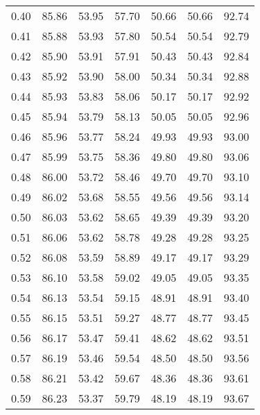 \begin{tabular}{|c|c|c|c|c|c|c|}
      0.40 &     85.86 &     53.95 &      57.70 &   50.66 &      50.66 &         92.74 \\
      0.41 &     85.88 &     53.93 &      57.80 &   50.54 &      50.54 &         92.79 \\
      0.42 &     85.90 &     53.91 &      57.91 &   50.43 &      50.43 &         92.84 \\
      0.43 &     85.92 &     53.90 &      58.00 &   50.34 &      50.34 &         92.88 \\
      0.44 &     85.93 &     53.83 &      58.06 &   50.17 &      50.17 &         92.92 \\
      0.45 &     85.94 &     53.79 &      58.13 &   50.05 &      50.05 &         92.96 \\
      0.46 &     85.96 &     53.77 &      58.24 &   49.93 &      49.93 &         93.00 \\
      0.47 &     85.99 &     53.75 &      58.36 &   49.80 &      49.80 &         93.06 \\
      0.48 &     86.00 &     53.72 &      58.46 &   49.70 &      49.70 &         93.10 \\
      0.49 &     86.02 &     53.68 &      58.55 &   49.56 &      49.56 &         93.14 \\
      0.50 &     86.03 &     53.62 &      58.65 &   49.39 &      49.39 &         93.20 \\
      0.51 &     86.06 &     53.62 &      58.78 &   49.28 &      49.28 &         93.25 \\
      0.52 &     86.08 &     53.59 &      58.89 &   49.17 &      49.17 &         93.29 \\
      0.53 &     86.10 &     53.58 &      59.02 &   49.05 &      49.05 &         93.35 \\
      0.54 &     86.13 &     53.54 &      59.15 &   48.91 &      48.91 &         93.40 \\
      0.55 &     86.15 &     53.51 &      59.27 &   48.77 &      48.77 &         93.45 \\
      0.56 &     86.17 &     53.47 &      59.41 &   48.62 &      48.62 &         93.51 \\
      0.57 &     86.19 &     53.46 &      59.54 &   48.50 &      48.50 &         93.56 \\
      0.58 &     86.21 &     53.42 &      59.67 &   48.36 &      48.36 &         93.61 \\
      0.59 &     86.23 &     53.37 &      59.79 &   48.19 &      48.19 &         93.67 \\

\end{tabular}
